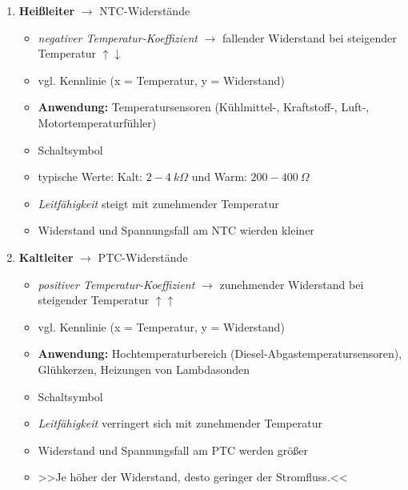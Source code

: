 \begin{enumerate}
\item
  \textbf{Heißleiter} $\to$ NTC-Widerstände

  \begin{itemize}
  \item
    \emph{negativer Temperatur-Koeffizient} $\to$ fallender Widerstand
    bei steigender Temperatur $\uparrow \downarrow$
  \item
    vgl. Kennlinie (x = Temperatur, y = Widerstand)
  \item
    \textbf{Anwendung:} Temperatursensoren (Kühlmittel-, Kraftstoff-,
    Luft-, Motortemperaturfühler)
  \item
    Schaltsymbol
  \item
    typische Werte: Kalt: $2 - 4~k\Omega$ und Warm:
    $200 - 400~\Omega$
  \item
    \emph{Leitfähigkeit} steigt mit zunehmender Temperatur
  \item
    Widerstand und Spannungsfall am NTC wierden kleiner
  \end{itemize}
\item
  \textbf{Kaltleiter} $\to$ PTC-Widerstände

  \begin{itemize}
  \item
    \emph{positiver Temperatur-Koeffizient} $\to$ zunehmender
    Widerstand bei steigender Temperatur $\uparrow \uparrow$
  \item
    vgl. Kennlinie (x = Temperatur, y = Widerstand)
  \item
    \textbf{Anwendung:} Hochtemperaturbereich
    (Diesel-Abgastemperatursensoren), Glühkerzen, Heizungen von
    Lambdasonden
  \item
    Schaltsymbol
  \item
    \emph{Leitfähigkeit} verringert sich mit zunehmender Temperatur
  \item
    Widerstand und Spannungsfall am PTC werden größer
  \item
    >>Je höher der Widerstand, desto geringer der Stromfluss.<<
  \end{itemize}
\end{enumerate}
